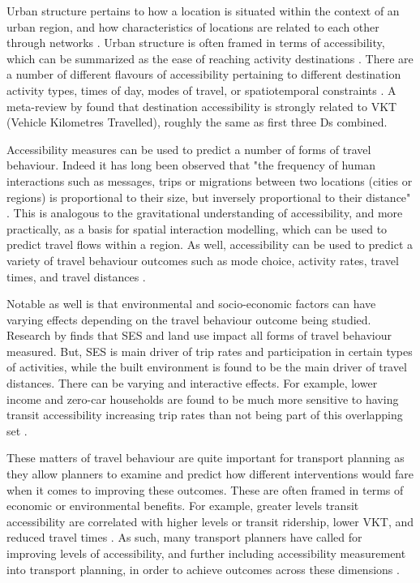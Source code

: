 Urban structure pertains to how a location is situated within the context of an urban region, and how characteristics of locations are related to each other through networks \cite{anas_urban_1998}. Urban structure is often framed in terms of accessibility, which can be summarized as the ease of reaching activity destinations \cite{hansen_how_1959,geurs_accessibility_2004}. There are a number of different flavours of accessibility pertaining to different destination activity types, times of day, modes of travel, or spatiotemporal constraints \cite{geurs_accessibility_2004,levinson_towards_2020}. A meta-review by  found that destination accessibility is strongly related to VKT (Vehicle Kilometres Travelled), roughly the same as first three Ds combined. 

Accessibility measures can be used to predict a number of forms of travel behaviour. Indeed it has long been observed that "the frequency of human interactions such as messages, trips or migrations between two locations (cities or regions) is proportional to their size, but inversely proportional to their distance" \cite{wegener_land-use_2004}. This is analogous to the gravitational understanding of accessibility, and more practically, as a basis for spatial interaction modelling, which can be used to predict travel flows within a region. As well, accessibility can be used to predict a variety of travel behaviour outcomes such as mode choice, activity rates, travel times, and travel distances \cite{ewing_travel_2010,koenig_indicators_1980,badoe_transportationland-use_2000}. 

Notable as well is that environmental and socio-economic factors can have varying effects depending on the travel behaviour outcome being studied. Research by  finds that SES and land use impact all forms of travel behaviour measured. But, SES is main driver of trip rates and participation in certain types of activities, while the built environment is found to be the main driver of travel distances. There can be varying and interactive effects. For example, lower income and zero-car households are found to be much more sensitive to having transit accessibility increasing trip rates than not being part of this overlapping set \cite{allen_planning_2020}.

These matters of travel behaviour are quite important for transport planning as they allow planners to examine and predict how different interventions would fare when it comes to improving these outcomes. These are often framed in terms of economic or environmental benefits. For example, greater levels transit accessibility are correlated with higher levels or transit ridership, lower VKT, and reduced travel times \cite{badoe_transportationland-use_2000,ewing_travel_2010}. As such, many transport planners have called for improving levels of accessibility, and further including accessibility measurement into transport planning, in order to achieve outcomes across these dimensions \cite{handy_measuring_1997}.

